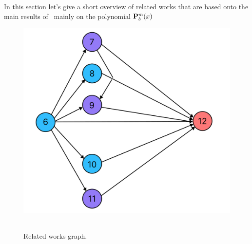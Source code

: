 In this section let's give a short overview of related works that are based
onto the main results of~\cite{kolosov2016link} mainly on the polynomial ${\mathbf{P}}\sp{m} \sb{b}(x)$
\begin{figure}[H]
    \centering
    \includegraphics[width=1\textwidth]{images/realated_works_graph}
    ~\caption{Related works graph.}\label{fig:related-works-graph}
\end{figure}
